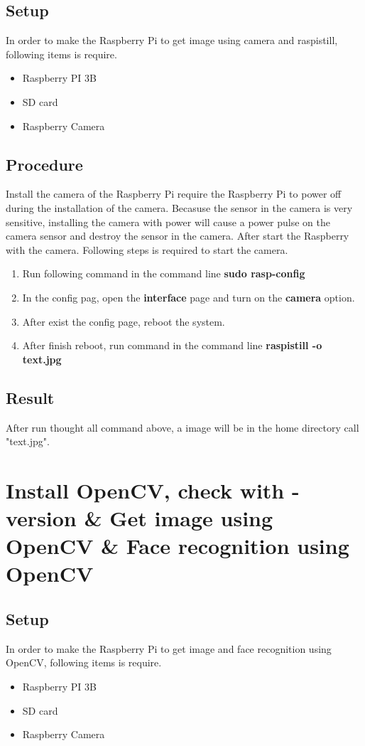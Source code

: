 \documentclass{article}
\begin{document}
\subsection{Setup}
In order to make the Raspberry Pi to get image using camera and raspistill, following items is require.
\begin{itemize}
	\item Raspberry PI 3B
	\item SD card
	\item Raspberry Camera
\end{itemize}
\subsection{Procedure}
Install the camera of the Raspberry Pi require the Raspberry Pi to power off during the installation of the camera. Becasuse the sensor in the camera is very sensitive, installing the camera with power will cause a power pulse on the camera sensor and destroy the sensor in the camera. After start the Raspberry with the camera. Following steps is required to start the camera.
\begin{enumerate}
	\item Run following command in the command line \textbf{sudo rasp-config}
	\item In the config pag, open the \textbf{interface} page and turn on the \textbf{camera} option.
	\item After exist the config page, reboot the system.
	\item After finish reboot, run command in the command line \textbf{raspistill -o text.jpg}
\end{enumerate}
\subsection{Result}
After run thought all command above, a image will be in the home directory call "text.jpg".
\clearpage

\section{Install OpenCV, check with -version \& Get image using OpenCV \& Face recognition using OpenCV}
\subsection{Setup}
In order to make the Raspberry Pi to get image and face recognition using OpenCV, following items is require.
\begin{itemize}
	\item Raspberry PI 3B
	\item SD card
	\item Raspberry Camera
\end{itemize}
\end{document}
